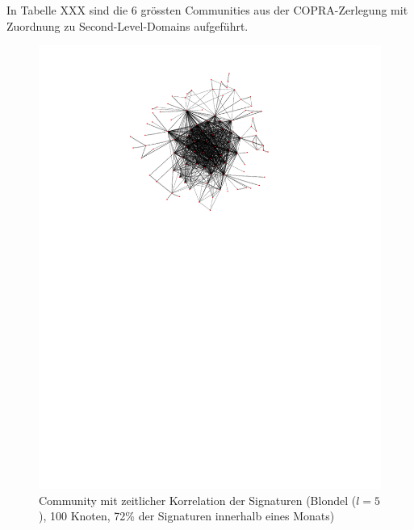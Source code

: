 In Tabelle XXX sind die 6 gr\"ossten Communities aus der
COPRA-Zerlegung mit Zuordnung zu Second-Level-Domains aufgef\"uhrt.

\begin{figure}[th]
  \centering
  \includegraphics[scale=1.5]{images/subgraph-label-time-fa62cc57cd35e9f90b85435efc407ad5.pdf}
  \caption{Community mit zeitlicher Korrelation der Signaturen
    (Blondel ($l=5$),
    100 Knoten, 72\% der Signaturen innerhalb eines Monats)}
  \label{fig:time-corr-com-normal}
\end{figure}


